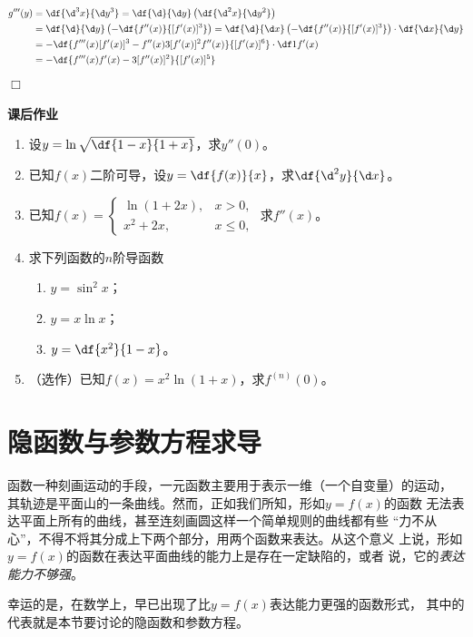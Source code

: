 \begin{align*}
	g'''(y)
	&=\df{\d^3 x}{\d y^3}
	=\df{\d }{\d y}\left(\df{\d^2 x}{\d y^2}\right)\\
	&=\df{\d }{\d y}\left(-\df{f''(x)}{[f'(x)]^3}\right)
	=\df{\d }{\d x}\left(-\df{f''(x)}{[f'(x)]^3}\right)
	\cdot\df{\d x}{\d y}\\
	&=-\df{f'''(x)[f'(x)]^3-f''(x)3[f'(x)]^2f''(x)}{[f'(x)]^6}
	\cdot\df1{f'(x)}\\
	&=-\df{f'''(x)f'(x)-3[f''(x)]^2}{[f'(x)]^5}
\end{align*}
\hfill$\Box$

\begin{ext}
	{\centering\bf 课后作业}
	
	\begin{enumerate}
	  \item 设$y=\ln\sqrt{\df{1-x}{1+x}}$，求$y''(0)$。
	  \item 已知$f(x)$二阶可导，设$y=\df{f(x)}{x}$，求$\df{\d^2y}{\d x}$。
	  \item 已知$f(x)=\left\{\begin{array}{ll}
	  	\ln(1+2x),& x>0, \\ x^2+2x, & x\leq 0,
	  \end{array}\right.$
	  求$f''(x)$。
	  \item 求下列函数的$n$阶导函数
	  \begin{enumerate}[(1)]
	    \item $y=\sin^2x$；
	    \item $y=x\ln x$；
	    \item $y=\df{x^2}{1-x}$。
	  \end{enumerate}
	  \item （选作）已知$f(x)=x^2\ln(1+x)$，求$f^{(n)}(0)$。
	\end{enumerate}
\end{ext}

\section{隐函数与参数方程求导}

函数一种刻画运动的手段，一元函数主要用于表示一维（一个自变量）的运动，
其轨迹是平面山的一条曲线。然而，正如我们所知，形如$y=f(x)$的函数
无法表达平面上所有的曲线，甚至连刻画圆这样一个简单规则的曲线都有些
“力不从心”，不得不将其分成上下两个部分，用两个函数来表达。从这个意义
上说，形如$y=f(x)$的函数在表达平面曲线的能力上是存在一定缺陷的，或者
说，它的{\it 表达能力不够强}。

幸运的是，在数学上，早已出现了比$y=f(x)$表达能力更强的函数形式，
其中的代表就是本节要讨论的隐函数和参数方程。

